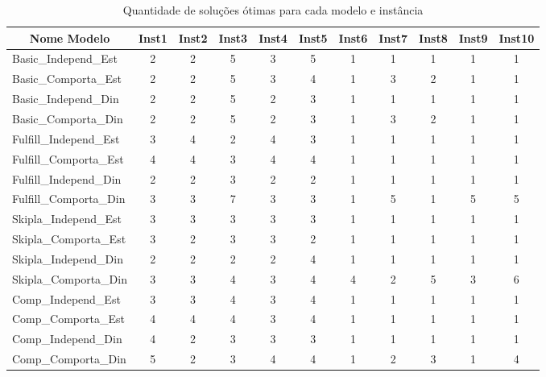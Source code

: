 \begin{table}[H]
	\centering
	\footnotesize
	\renewcommand{\arraystretch}{1.1}
	\begin{tabular}{@{} lcccccccccc @{}}
		\toprule
		\multicolumn{1}{c}{\textbf{Nome Modelo}} &
		\multicolumn{1}{c}{\textbf{Inst1}}       &
		\multicolumn{1}{c}{\textbf{Inst2}}       &
		\multicolumn{1}{c}{\textbf{Inst3}}       &
		\multicolumn{1}{c}{\textbf{Inst4}}       &
		\multicolumn{1}{c}{\textbf{Inst5}}       &
		\multicolumn{1}{c}{\textbf{Inst6}}       &
		\multicolumn{1}{c}{\textbf{Inst7}}       &
		\multicolumn{1}{c}{\textbf{Inst8}}       &
		\multicolumn{1}{c}{\textbf{Inst9}}       &
		\multicolumn{1}{c}{\textbf{Inst10}}                                                \\
		\midrule
		Basic\_Independ\_Est   & 2 & 2 & 5 & 3 & 5 & 1 & 1 & 1  & 1  & 1 \\
		Basic\_Comporta\_Est   & 2 & 2 & 5 & 3 & 4 & 1 & 3 & 2 & 1 & 1 \\
		Basic\_Independ\_Din   & 2 & 2 & 5 & 2 & 3 & 1 & 1 & 1  & 1  & 1 \\
		Basic\_Comporta\_Din   & 2 & 2 & 5 & 2 & 3 & 1 & 3 & 2 & 1 & 1 \\ \hline
		Fulfill\_Independ\_Est & 3 & 4 & 2 & 4 & 3 & 1 & 1 & 1  & 1  & 1 \\
		Fulfill\_Comporta\_Est & 4 & 4 & 3 & 4 & 4 & 1 & 1 & 1 & 1 & 1 \\
		Fulfill\_Independ\_Din & 2 & 2 & 3 & 2 & 2 & 1 & 1 & 1  & 1  & 1 \\
		Fulfill\_Comporta\_Din & 3 & 3 & 7 & 3 & 3 & 1 & 5 & 1 & 5 & 5 \\ \hline
		Skipla\_Independ\_Est  & 3 & 3 & 3 & 3 & 3 & 1 & 1 & 1  & 1  & 1 \\
		Skipla\_Comporta\_Est  & 3 & 2 & 3 & 3 & 2 & 1 & 1 & 1 & 1 & 1 \\
		Skipla\_Independ\_Din  & 2 & 2 & 2 & 2 & 4 & 1 & 1 & 1  & 1  & 1 \\
		Skipla\_Comporta\_Din  & 3 & 3 & 4 & 3 & 4 & 4 & 2 & 5 & 3 & 6 \\ \hline
		Comp\_Independ\_Est    & 3 & 3 & 4 & 3 & 4 & 1 & 1 & 1  & 1  & 1 \\
		Comp\_Comporta\_Est    & 4 & 4 & 4 & 3 & 4 & 1 & 1 & 1 & 1 & 1 \\
		Comp\_Independ\_Din    & 4 & 2 & 3 & 3 & 3 & 1 & 1 & 1  & 1  & 1 \\
		Comp\_Comporta\_Din    & 5 & 2 & 3 & 4 & 4 & 1 & 2 & 3 & 1 & 4 \\
		\bottomrule
	\end{tabular}

	\caption{Quantidade de soluções ótimas para cada modelo e instância}
	\label{tab: num_solucoes}
\end{table}


